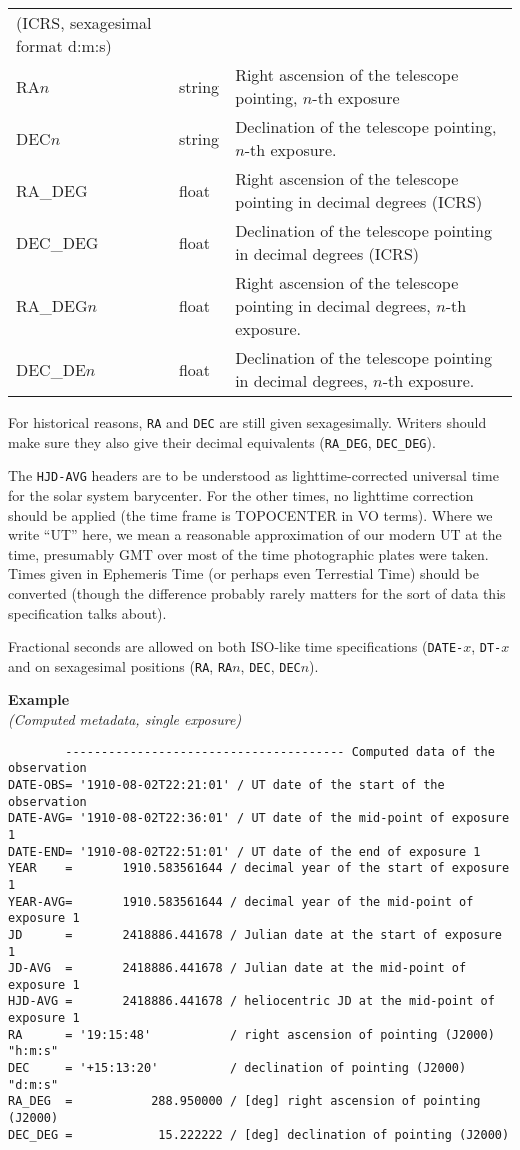 \documentclass[11pt]{ivoa}
\newcommand\cardname[1]{\texttt{\color{keyword}#1}}
\newenvironment{fitsexample}[1]
{\bigskip\noindent\textbf{Example}\\\textit{(#1)\smallskip}}
{\medskip}
\begin{document}
\begin{longtable}{llp{}}
(ICRS, sexagesimal format d:m:s)\\
RA$n$     &string    & Right ascension of the telescope
pointing, $n$-th exposure\\
DEC$n$    &string    & Declination of the telescope pointing,
$n$-th exposure.\\
RA\_DEG   &float    & Right ascension of the telescope
pointing in decimal degrees (ICRS)\\
DEC\_DEG  &float    & Declination of the telescope pointing in
decimal degrees (ICRS)\\
RA\_DEG$n$&float    & Right ascension of the telescope
pointing in decimal degrees, $n$-th exposure.\\
DEC\_DE$n$&float    & Declination of the telescope pointing in
decimal degrees, $n$-th exposure.\\
\end{longtable}
\endgroup

For historical reasons, \cardname{RA} and \cardname{DEC} are still given
sexagesimally.  Writers should make sure they also give their decimal
equivalents (\cardname{RA\_DEG}, \cardname{DEC\_DEG}).

The \cardname{HJD-AVG} headers are to be understood as
lighttime-corrected universal time for the solar system barycenter.  For
the other times, no lighttime correction should be applied (the time
frame is TOPOCENTER in VO terms).  Where we write ``UT'' here, we mean a
reasonable approximation of our modern UT at the time, presumably GMT
over most of the time photographic plates were taken.  Times given in
Ephemeris Time (or perhaps even Terrestial Time) should be converted
(though the difference probably rarely matters for the sort of data this
specification talks about).

Fractional seconds are allowed on both ISO-like time specifications
(\cardname{DATE-$x$}, \cardname{DT-$x$} and on sexagesimal positions
(\cardname{RA}, \cardname{RA$n$}, \cardname{DEC}, \cardname{DEC$n$}).


\begin{fitsexample}{Computed metadata, single exposure}
\begin{lstlisting}
        --------------------------------------- Computed data of the observation
DATE-OBS= '1910-08-02T22:21:01' / UT date of the start of the observation
DATE-AVG= '1910-08-02T22:36:01' / UT date of the mid-point of exposure 1
DATE-END= '1910-08-02T22:51:01' / UT date of the end of exposure 1
YEAR    =       1910.583561644 / decimal year of the start of exposure 1
YEAR-AVG=       1910.583561644 / decimal year of the mid-point of exposure 1
JD      =       2418886.441678 / Julian date at the start of exposure 1
JD-AVG  =       2418886.441678 / Julian date at the mid-point of exposure 1
HJD-AVG =       2418886.441678 / heliocentric JD at the mid-point of exposure 1
RA      = '19:15:48'           / right ascension of pointing (J2000) "h:m:s"
DEC     = '+15:13:20'          / declination of pointing (J2000) "d:m:s"
RA_DEG  =           288.950000 / [deg] right ascension of pointing (J2000)
DEC_DEG =            15.222222 / [deg] declination of pointing (J2000)
\end{lstlisting}
\end{fitsexample}
\end{document}
